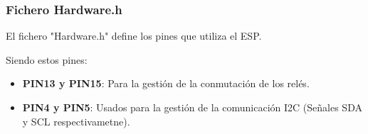 \subsubsection{Fichero Hardware.h}

El fichero "Hardware.h" define los pines que utiliza el ESP. 

Siendo estos pines:
\begin{itemize}
    \item \textbf{PIN13 y PIN15}: Para la gestión de la conmutación de los relés. 
    \item \textbf{PIN4 y PIN5}: Usados para la gestión de la comunicación I2C (Señales SDA y SCL respectivametne). 
\end{itemize}

